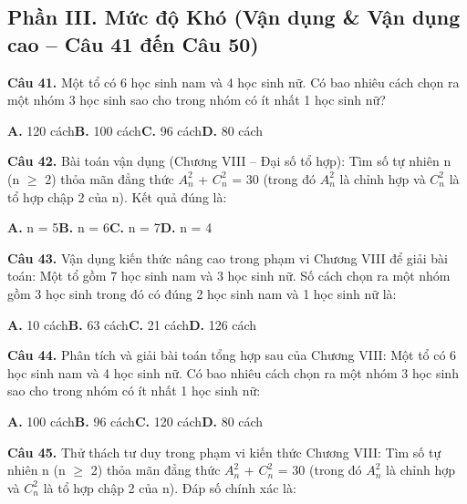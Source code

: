 \documentclass[11pt,a4paper]{article}
\begin{document}
\subsection*{\color{accent} Phần III. Mức độ Khó (Vận dụng \& Vận dụng cao -- Câu 41 đến Câu 50)}
\textbf{\color{primary} Câu 41.} Một tổ có 6 học sinh nam và 4 học sinh nữ. Có bao nhiêu cách chọn ra một nhóm 3 học sinh sao cho trong nhóm có ít nhất 1 học sinh nữ?\par
\hspace*{1.5em}\textbf{A.} 120 cách\quad\quad \textbf{B.} 100 cách\quad\quad \textbf{C.} 96 cách\quad\quad \textbf{D.} 80 cách\par\vspace{2pt}
\textbf{\color{primary} Câu 42.} Bài toán vận dụng (Chương VIII – Đại số tổ hợp): Tìm số tự nhiên n (n $\ge$ 2) thỏa mãn đẳng thức $A_n^2$ + $C_n^2$ = 30 (trong đó $A_n^2$ là chỉnh hợp và $C_n^2$ là tổ hợp chập 2 của n). Kết quả đúng là:\par
\hspace*{1.5em}\textbf{A.} n = 5\quad\quad \textbf{B.} n = 6\quad\quad \textbf{C.} n = 7\quad\quad \textbf{D.} n = 4\par\vspace{2pt}
\textbf{\color{primary} Câu 43.} Vận dụng kiến thức nâng cao trong phạm vi Chương VIII để giải bài toán: Một tổ gồm 7 học sinh nam và 3 học sinh nữ. Số cách chọn ra một nhóm gồm 3 học sinh trong đó có đúng 2 học sinh nam và 1 học sinh nữ là:\par
\hspace*{1.5em}\textbf{A.} 10 cách\quad\quad \textbf{B.} 63 cách\quad\quad \textbf{C.} 21 cách\quad\quad \textbf{D.} 126 cách\par\vspace{2pt}
\textbf{\color{primary} Câu 44.} Phân tích và giải bài toán tổng hợp sau của Chương VIII: Một tổ có 6 học sinh nam và 4 học sinh nữ. Có bao nhiêu cách chọn ra một nhóm 3 học sinh sao cho trong nhóm có ít nhất 1 học sinh nữ:\par
\hspace*{1.5em}\textbf{A.} 100 cách\quad\quad \textbf{B.} 96 cách\quad\quad \textbf{C.} 120 cách\quad\quad \textbf{D.} 80 cách\par\vspace{2pt}
\textbf{\color{primary} Câu 45.} Thử thách tư duy trong phạm vi kiến thức Chương VIII: Tìm số tự nhiên n (n $\ge$ 2) thỏa mãn đẳng thức $A_n^2$ + $C_n^2$ = 30 (trong đó $A_n^2$ là chỉnh hợp và $C_n^2$ là tổ hợp chập 2 của n). Đáp số chính xác là:\par
\end{document}
